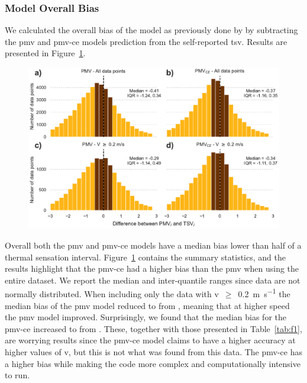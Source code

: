 \subsubsection{Model Overall Bias}\label{subsubsec:model-overall-bias}
We calculated the overall bias of the model as previously done by  by subtracting the \ac{pmv} and  \ac{pmv-ce} models prediction from the self-reported \ac{tsv}.
Results are presented in Figure~\ref{fig:hist_discrepancies}.
\begin{figure}[htb!]
    \centering
    \includegraphics[width=\textwidth]{figures/hist_discrepancies}
    \caption{}
    \label{fig:hist_discrepancies}
\end{figure} 
Overall both the \ac{pmv} and \ac{pmv-ce} models have a median bias lower than half of a thermal sensation interval.
Figure~\ref{fig:hist_discrepancies} contains the summary statistics, and the results highlight that the \ac{pmv-ce} had a higher bias than the \ac{pmv} when using the entire dataset.
We report the median and inter-quantile ranges since data are not normally distributed.
When including only the data with \ac{v}~$\geq$~\qty{0.2}{\m\per\s} the median bias of the \ac{pmv} model reduced to  from , meaning that at higher speed the \ac{pmv} model improved.
Surprisingly, we found that the median bias for the \ac{pmv-ce} increased to  from .
These, together with those presented in Table~\ref{tab:f1}, are worrying results since the \ac{pmv-ce} model claims to have a higher accuracy at higher values of \ac{v}, but this is not what was found from this data.
The \ac{pmv-ce} has a higher bias while making the code more complex and computationally intensive to run.

